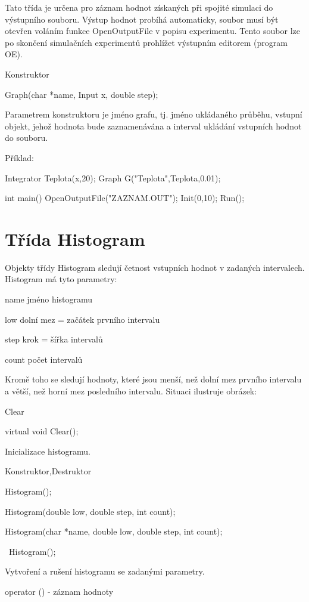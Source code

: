 \documentclass[a4paper]{article}
\begin{document}
Tato třída je určena pro záznam hodnot získaných při spojité simulaci
do výstupního souboru. Výstup hodnot probíhá automaticky, soubor
musí být otevřen voláním funkce OpenOutputFile v popisu
experimentu. Tento soubor lze po skončení simulačních experimentů
prohlížet výstupním editorem (program OE).


Konstruktor

  Graph(char *name, Input x, double step);


Parametrem konstruktoru je jméno grafu, tj. jméno ukládaného průběhu,
vstupní objekt, jehož hodnota bude zaznamenávána a interval ukládání
vstupních hodnot do souboru.

Příklad:

Integrator Teplota(x,20);
Graph G("Teplota",Teplota,0.01);

int main()
{
  OpenOutputFile("ZAZNAM.OUT");
  Init(0,10);
  Run();
}

\section{Třída Histogram}

Objekty třídy Histogram sledují četnost vstupních hodnot
v zadaných intervalech. Histogram má tyto parametry:



name       jméno histogramu

low        dolní mez = začátek prvního intervalu

step       krok = šířka intervalů

count      počet intervalů




Kromě toho se sledují hodnoty, které jsou menší, než dolní mez prvního
intervalu a větší, než horní mez posledního intervalu. Situaci ilustruje
obrázek:


Clear

  virtual void Clear();


Inicializace histogramu.


Konstruktor,Destruktor

  Histogram();

  Histogram(double low, double step, int count);

  Histogram(char *name, double low, double step, int count);

  ~Histogram();


Vytvoření a rušení histogramu se zadanými parametry.


operator () - záznam hodnoty
\end{document}
